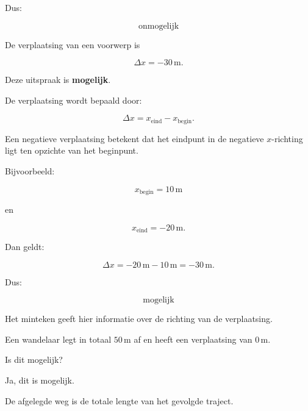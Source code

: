 \documentclass{ximera}
\begin{document}
\begin{oefening}{\oefB\ESS}
\begin{question}
\begin{oplossing}
  Dus:
  
  \[
  \boxed{\text{onmogelijk}}
  \]
  
  \end{oplossing}
  
  \end{question}
  
  
  \begin{question}
  
  De verplaatsing van een voorwerp is
  
  \[
  \Delta x=-30\,\mathrm{m}.
  \]
  
  \begin{oplossing}
  
  Deze uitspraak is \textbf{mogelijk}.
  
  De verplaatsing wordt bepaald door:
  
  \[
  \Delta x=x_{\text{eind}}-x_{\text{begin}}.
  \]
  
  Een negatieve verplaatsing betekent dat het eindpunt in de negatieve
  $x$-richting ligt ten opzichte van het beginpunt.
  
  Bijvoorbeeld:
  
  \[
  x_{\text{begin}}=10\,\mathrm{m}
  \]
  
  en
  
  \[
  x_{\text{eind}}=-20\,\mathrm{m}.
  \]
  
  Dan geldt:
  
  \[
  \Delta x
  =
  -20\,\mathrm{m}-10\,\mathrm{m}
  =
  -30\,\mathrm{m}.
  \]
  
  Dus:
  
  \[
  \boxed{\text{mogelijk}}
  \]
  
  Het minteken geeft hier informatie over de richting van de verplaatsing.
  
  \end{oplossing}
  
  \end{question}
  
  \begin{question}

    Een wandelaar legt in totaal $50\,\mathrm{m}$ af en heeft een verplaatsing van
    $0\,\mathrm{m}$.
    
    Is dit mogelijk?
    
    \begin{oplossing}
    
    Ja, dit is mogelijk.
    
    De afgelegde weg is de totale lengte van het gevolgde traject.
    

\end{oplossing}
\end{question}
\end{oefening}
\end{document}
